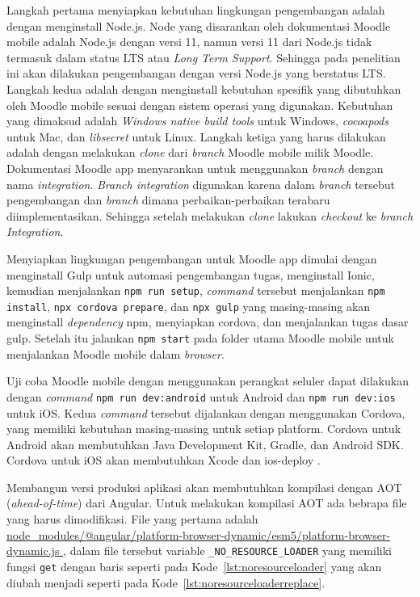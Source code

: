 Langkah pertama menyiapkan kebutuhan lingkungan pengembangan adalah dengan menginstall Node.js. Node yang disarankan oleh dokumentasi Moodle mobile adalah Node.js dengan versi 11\cite{moodle:dev}, namun versi 11 dari Node.js tidak termasuk dalam status LTS atau \textit{Long Term Support}\cite{nodejs:status}. Sehingga pada penelitian ini akan dilakukan pengembangan dengan versi Node.js yang berstatus LTS. Langkah kedua adalah dengan menginstall kebutuhan spesifik yang dibutuhkan oleh Moodle mobile sesuai dengan sistem operasi yang digunakan. Kebutuhan yang dimaksud adalah \textit{Windows native build tools} untuk Windows, \textit{cocoapods} untuk Mac, dan \textit{libsecret} untuk Linux. Langkah ketiga yang harus dilakukan adalah dengan melakukan \textit{clone} dari \textit{branch} Moodle mobile milik Moodle. Dokumentasi Moodle app menyarankan untuk menggunakan \textit{branch} dengan nama \textit{integration}\cite{moodle:dev}. \textit{Branch integration} digunakan karena dalam \textit{branch} tersebut pengembangan dan \textit{branch} dimana perbaikan-perbaikan terabaru diimplementasikan. Sehingga setelah melakukan \textit{clone} lakukan \textit{checkout} ke \textit{branch Integration}.


Menyiapkan lingkungan pengembangan untuk Moodle app dimulai dengan menginstall Gulp untuk automasi pengembangan tugas, menginstall Ionic, kemudian menjalankan \texttt{npm run setup}, \textit{command} tersebut menjalankan \texttt{npm install}, \texttt{npx cordova prepare}, dan \texttt{npx gulp} yang masing-masing akan menginstall \textit{dependency} npm, menyiapkan cordova, dan menjalankan tugas dasar gulp. Setelah itu jalankan \texttt{npm start} pada folder utama Moodle mobile untuk menjalankan Moodle mobile dalam \textit{browser}.

Uji coba Moodle mobile dengan menggunakan perangkat seluler dapat dilakukan dengan \textit{command} \texttt{npm run dev:android} untuk Android dan \texttt{npm run dev:ios} untuk iOS. Kedua \textit{command} tersebut dijalankan dengan menggunakan Cordova, yang memiliki kebutuhan masing-masing untuk setiap platform. Cordova untuk Android akan membutuhkan Java Development Kit, Gradle, dan Android SDK\cite{cordova:android}. Cordova untuk iOS akan membutuhkan Xcode dan ios-deploy \cite{cordova:iOS}.

Membangun versi produksi aplikasi akan membutuhkan kompilasi dengan AOT (\textit{ahead-of-time}) dari Angular. Untuk melakukan kompilasi AOT ada bebrapa file yang harus dimodifikasi. File yang pertama adalah \url{node_modules/@angular/platform-browser-dynamic/esm5/platform-browser-dynamic.js }, dalam file tersebut variable \texttt{\_NO\_RESOURCE\_LOADER} yang memiliki fungsi \texttt{get} dengan baris seperti pada \mbox{Kode \ref{lst:noresourceloader}} yang akan diubah menjadi seperti pada \mbox{Kode \ref{lst:noresourceloaderreplace}}.

